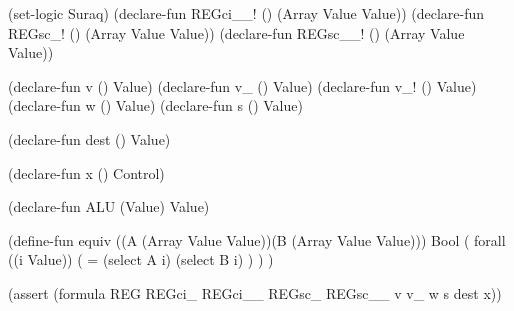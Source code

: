 \documentclass[a4paper]{article}
\begin{document}
\begin{algorithm}
\DontPrintSemicolon
  (set-logic Suraq)\;
  (declare-fun REGci\_\_! () (Array Value Value))\;
  (declare-fun REGsc\_!  () (Array Value Value))\;
  (declare-fun REGsc\_\_! () (Array Value Value))\;

  (declare-fun v   () Value)\;
  (declare-fun v\_  () Value)\;
  (declare-fun v\_! () Value)\;
  (declare-fun w   () Value)\;
  (declare-fun s () Value)\;

  (declare-fun dest () Value)\;

  (declare-fun x () Control)\;

  (declare-fun ALU (Value) Value)\;

  (define-fun equiv ((A (Array Value Value))(B (Array Value Value))) Bool (\;
    forall ((i Value)) (\;
      = (select A i)\;
        (select B i)\;
      )\;
    )\;
  )\;

  (assert (formula REG REGci\_  REGci\_\_  REGsc\_  REGsc\_\_  v v\_  w s dest x))\;
\end{algorithm}



\end{document}
